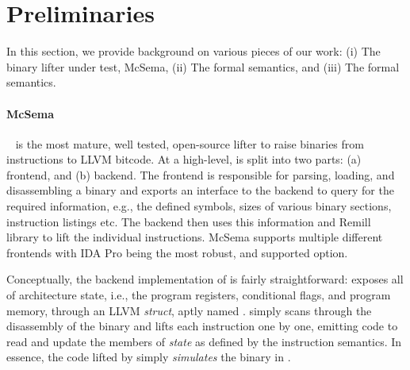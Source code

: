 \section{Preliminaries}
\label{sec:prelim}

In this section, we provide background on various pieces of our work:
(i) The binary lifter under test, McSema, (ii) The formal \ISA semantics, and
(iii) The formal \LLVM semantics.

\paragraph{McSema}\label{par:mcsema} \mcsema~\cite{McSema:Recon14} is the most
mature, well tested, open-source lifter to raise binaries from \ISA
instructions to LLVM bitcode.  At a high-level, \mcsema is split into two
parts: (a) frontend, and (b) backend. The frontend is responsible for parsing,
loading, and disassembling a binary and exports an interface to the backend to
query for the required information, e.g., the defined symbols, sizes of
various binary sections, instruction listings etc. The backend then uses this
information and Remill~\cite{Remill} library to lift the individual
instructions. McSema supports multiple different frontends with IDA Pro being
the most robust, and supported option.

Conceptually, the backend implementation of \mcsema is fairly straightforward:
\mcsema exposes all of architecture state, i.e., the program registers,
conditional flags, and program memory, through an LLVM \emph{struct}, aptly
named \Mcstate. \mcsema simply scans through the disassembly of the binary
and lifts each instruction one by one, emitting code to read and update the
members of \emph{state} as defined by the instruction semantics. In essence,
the code lifted by \mcsema simply \emph{simulates} the binary in \LLVM.

